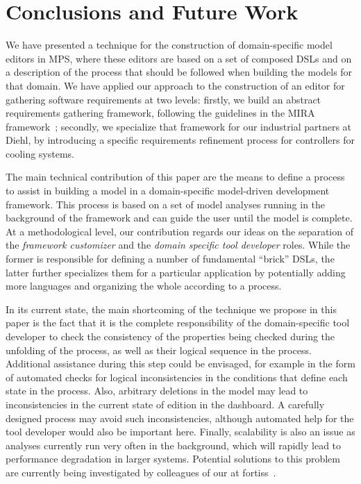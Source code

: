 \section{Conclusions and Future Work}
\label{sec:conclusion}
 \vspace{-.6cm}
We have presented a technique for the construction of
domain-specific model editors in MPS, where these editors are based on
a set of composed DSLs and on a description of the process that
should be followed when building the models for that domain. We have applied our
approach to the construction of an editor for gathering software requirements
at two levels: firstly, we build an abstract requirements gathering framework,
following the guidelines in the MIRA framework~\cite{MIRA13}; secondly, we
specialize that framework for our industrial partners at Diehl, by introducing
a specific requirements refinement process for controllers for cooling systems.

The main technical contribution of this paper are the means to define a process
to assist in building a model in a domain-specific model-driven development
framework. This process is based on a set of model analyses running in the
background of the framework and can guide the user until the model is complete.
At a methodological level, our contribution regards our ideas on the separation
of the \emph{framework customizer} and the  \emph{domain specific tool
developer} roles. While the former is responsible for defining a number of
fundamental ``brick'' DSLs, the latter further specializes them for a particular
application by potentially adding more languages and organizing the whole
according to a process.

In its current state, the main shortcoming of the technique we propose in this
paper is the fact that it is the complete responsibility of the domain-specific
tool developer to check the consistency of the properties being checked during
the unfolding of the process, as well as their logical sequence in the process.
Additional assistance during this step could be envisaged, for example in the
form of automated checks for logical inconsistencies in the conditions that
define each state in the process. Also, arbitrary deletions in the model may
lead to inconsistencies in the current state of edition in the dashboard. A
carefully designed process may avoid such inconsistencies, although automated
help for the tool developer would also be important here. Finally, scalability
is also an issue as analyses currently run very often in the background,
which will rapidly lead to performance degradation in larger systems. Potential
solutions to this problem are currently being investigated by colleagues of our
at fortiss~\cite{Models17Sudeep}.

